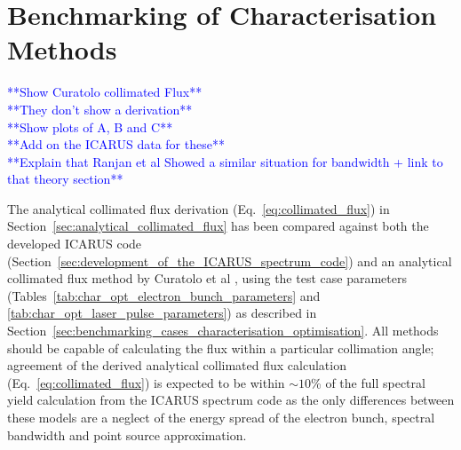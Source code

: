 \documentclass[../main.tex]{subfiles}
\begin{document}
\section{Benchmarking of Characterisation Methods}
\label{sec:benchmarking_of_the_ICARUS_spectrum_code}

\textcolor{blue}{**Show Curatolo collimated Flux** \\ **They don't show a derivation** \\ **Show plots of A, B and C** \\ **Add on the ICARUS data for these** \\ **Explain that Ranjan et al Showed a similar situation for bandwidth + link to that theory section**}

The analytical collimated flux derivation (Eq.~\ref{eq:collimated_flux}) in Section~\ref{sec:analytical_collimated_flux} has been compared against both the developed \textsc{ICARUS} code (Section~\ref{sec:development_of_the_ICARUS_spectrum_code}) and an analytical collimated flux method by Curatolo et al \cite{curatolo2017analytical}, using the test case parameters (Tables~\ref{tab:char_opt_electron_bunch_parameters} and \ref{tab:char_opt_laser_pulse_parameters}) as described in Section~\ref{sec:benchmarking_cases_characterisation_optimisation}. All methods should be capable of calculating the flux within a particular collimation angle; agreement of the derived analytical collimated flux calculation (Eq.~\ref{eq:collimated_flux}) is expected to be within $\sim10$\% of the full spectral yield calculation from the \textsc{ICARUS} spectrum code as the only differences between these models are a neglect of the energy spread of the electron bunch, spectral bandwidth and point source approximation. 
\end{document}
